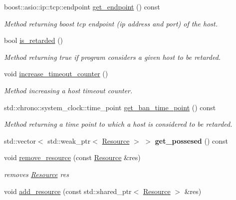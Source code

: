\begin{DoxyCompactItemize}
boost\+::asio\+::ip\+::tcp\+::endpoint \hyperlink{classsimpleP2P_1_1Host_a25780ee00b380a84ad0a3312bfa635cb}{get\+\_\+endpoint} () const
\begin{DoxyCompactList}\small\item\em Method returning boost tcp endpoint (ip address and port) of the host. \end{DoxyCompactList}\item 
bool \hyperlink{classsimpleP2P_1_1Host_ace84648960b75e127112069be905357c}{is\+\_\+retarded} ()
\begin{DoxyCompactList}\small\item\em Method returning true if program considers a given host to be retarded. \end{DoxyCompactList}\item 
void \hyperlink{classsimpleP2P_1_1Host_afcd858f4c6a7496b6164e36a5192f1db}{increase\+\_\+timeout\+\_\+counter} ()
\begin{DoxyCompactList}\small\item\em Method increasing a host timeout counter. \end{DoxyCompactList}\item 
std\+::chrono\+::system\+\_\+clock\+::time\+\_\+point \hyperlink{classsimpleP2P_1_1Host_abfde4abb7dda157b1f589267b5facf05}{get\+\_\+ban\+\_\+time\+\_\+point} () const
\begin{DoxyCompactList}\small\item\em Method returning a time point to which a host is considered to be retarded. \end{DoxyCompactList}\item 
\mbox{\label{classsimpleP2P_1_1Host_a389f4e3d1f287f1e2d1c3e4c0d8dc8bb}} 
std\+::vector$<$ std\+::weak\+\_\+ptr$<$ \hyperlink{classsimpleP2P_1_1Resource}{Resource} $>$ $>$ {\bfseries get\+\_\+possesed} () const
\item 
void \hyperlink{classsimpleP2P_1_1Host_acbe80ca99357b13ea06a56040bbd630f}{remove\+\_\+resource} (const \hyperlink{classsimpleP2P_1_1Resource}{Resource} \&res)
\begin{DoxyCompactList}\small\item\em removes \hyperlink{classsimpleP2P_1_1Resource}{Resource} res \end{DoxyCompactList}\item 
void \hyperlink{classsimpleP2P_1_1Host_a1b05aea31b1ae64ff77124c959dab26c}{add\+\_\+resource} (const std\+::shared\+\_\+ptr$<$ \hyperlink{classsimpleP2P_1_1Resource}{Resource} $>$ \&res)

\end{DoxyCompactItemize}

